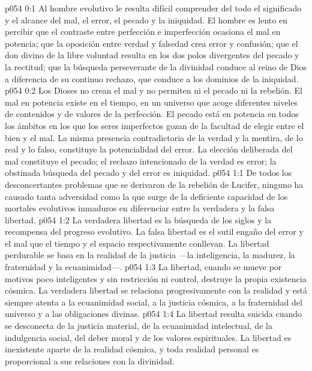 \author{Mensajero poderoso}
\vs p054 0:1 Al hombre evolutivo le resulta difícil comprender del todo el significado y el alcance del mal, el error, el pecado y la iniquidad. El hombre es lento en percibir que el contraste entre perfección e imperfección ocasiona el mal en potencia; que la oposición entre verdad y falsedad crea error y confusión; que el don divino de la libre voluntad resulta en los dos polos divergentes del pecado y la rectitud; que la búsqueda perseverante de la divinidad conduce al reino de Dios a diferencia de su continuo rechazo, que conduce a los dominios de la iniquidad.
\vs p054 0:2 Los Dioses no crean el mal y no permiten ni el pecado ni la rebelión. El mal en potencia existe en el tiempo, en un universo que acoge diferentes niveles de contenidos y de valores de la perfección. El pecado está en potencia en todos los ámbitos en los que los seres imperfectos gozan de la facultad de elegir entre el bien y el mal. La misma presencia contradictoria de la verdad y la mentira, de lo real y lo falso, constituye la potencialidad del error. La elección deliberada del mal constituye el pecado; el rechazo intencionado de la verdad es error; la obstinada búsqueda del pecado y del error es iniquidad.
\vs p054 1:1 De todos los desconcertantes problemas que se derivaron de la rebelión de Lucifer, ninguno ha causado tanta adversidad como la que surge de la deficiente capacidad de los mortales evolutivos inmaduros en diferenciar entre la verdadera y la falsa libertad.
\vs p054 1:2 La verdadera libertad es la búsqueda de los siglos y la recompensa del progreso evolutivo. La falsa libertad es el sutil engaño del error y el mal que el tiempo y el espacio respectivamente conllevan. La libertad perdurable se basa en la realidad de la justicia ---la inteligencia, la madurez, la fraternidad y la ecuanimidad---.
\vs p054 1:3 La libertad, cuando se mueve por motivos poco inteligentes y sin restricción ni control, destruye la propia existencia cósmica. La verdadera libertad se relaciona progresivamente con la realidad y está siempre atenta a la ecuanimidad social, a la justicia cósmica, a la fraternidad del universo y a las obligaciones divinas.
\vs p054 1:4 La libertad resulta suicida cuando se desconecta de la justicia material, de la ecuanimidad intelectual, de la indulgencia social, del deber moral y de los valores espirituales. La libertad es inexistente aparte de la realidad cósmica, y toda realidad personal es proporcional a sus relaciones con la divinidad.
